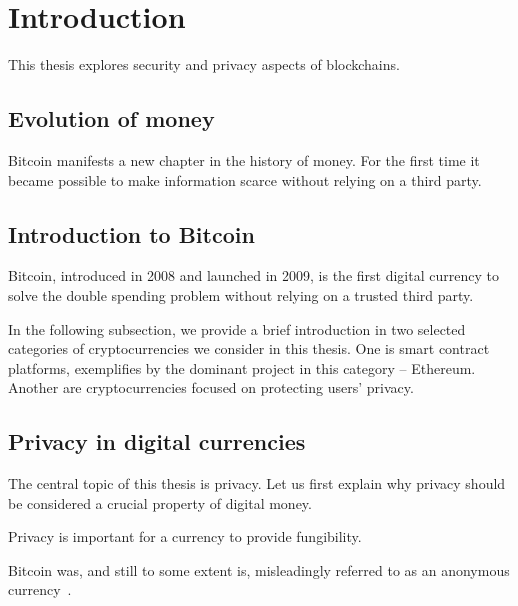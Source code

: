 \chapter{Introduction}

\label{Chapter01Introduction}

This thesis explores security and privacy aspects of blockchains.

\section{Evolution of money}

Bitcoin manifests a new chapter in the history of money.
For the first time it became possible to make information scarce without relying on a third party.

\section{Introduction to Bitcoin}

Bitcoin, introduced in 2008 and launched in 2009, is the first digital currency to solve the double spending problem without relying on a trusted third party.

In the following subsection, we provide a brief introduction in two selected categories of cryptocurrencies we consider in this thesis.
One is smart contract platforms, exemplifies by the dominant project in this category -- Ethereum.
Another are cryptocurrencies focused on protecting users' privacy.

\section{Privacy in digital currencies}

The central topic of this thesis is privacy.
Let us first explain why privacy should be considered a crucial property of digital money.

Privacy is important for a currency to provide fungibility.


Bitcoin was, and still to some extent is, misleadingly referred to as an anonymous currency~\cite{Reid2011}.

